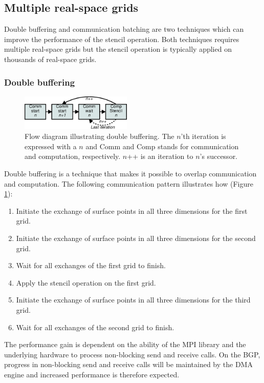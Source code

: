 \documentclass[preprint,3p,times,twocolumn]{elsarticle}
\begin{document}
\subsection{Multiple real-space grids}
Double buffering and communication batching are two techniques which can improve the performance of the stencil operation. Both techniques requires multiple real-space grids but the stencil operation is typically applied on thousands of real-space grids.

\subsubsection{Double buffering}

\begin{figure}
 \centering
 \includegraphics[width=200px]{gfx/commflow}
 \caption{Flow diagram illustrating double buffering. The $n$'th iteration is expressed with a $n$ and Comm and Comp stands for communication and computation, respectively. $n$++ is an iteration to $n$'s successor.}
 \label{fig:commflow}
\end{figure}

Double buffering is a technique that makes it possible to overlap communication and computation. The following communication pattern illustrates how (Figure \ref{fig:commflow}):
\begin{enumerate}
 \item Initiate the exchange of surface points in all three dimensions for the first grid.
 \item Initiate the exchange of surface points in all three dimensions for the second grid.
 \item Wait for all exchanges of the first grid to finish.
 \item Apply the stencil operation on the first grid.
 \item Initiate the exchange of surface points in all three dimensions for the third grid.
 \item Wait for all exchanges of the second grid to finish.
\end{enumerate}
The performance gain is dependent on the ability of the MPI library and the underlying hardware to process non-blocking send and receive calls. On the BGP, progress in non-blocking send and receive calls will be maintained by the DMA engine and increased performance is therefore expected.
\end{document}
